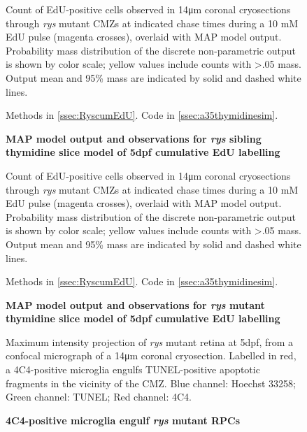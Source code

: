 \begin{figure}[!h]
    \caption{{\bf  MAP model output and observations for \textit{rys} sibling thymidine slice model of 5dpf cumulative EdU labelling}}
    Count of EdU-positive cells observed in 14\si{\micro\metre} coronal cryosections through \textit{rys} mutant CMZs at indicated chase times during a 10 mM EdU pulse (magenta crosses), overlaid with MAP model output. Probability mass distribution of the discrete non-parametric output is shown by color scale; yellow values include counts with >.05 mass. Output mean and 95\% mass are indicated by solid and dashed white lines.

    Methods in \autoref{ssec:RyscumEdU}. Code in \autoref{ssec:a35thymidinesim}.
    \label{a35sibMAP}
\end{figure}

\begin{figure}[!h]
    \caption{{\bf MAP model output and observations for \textit{rys} mutant thymidine slice model of 5dpf cumulative EdU labelling}}
    Count of EdU-positive cells observed in 14\si{\micro\metre} coronal cryosections through \textit{rys} mutant CMZs at indicated chase times during a 10 mM EdU pulse (magenta crosses), overlaid with MAP model output. Probability mass distribution of the discrete non-parametric output is shown by color scale; yellow values include counts with >.05 mass. Output mean and 95\% mass are indicated by solid and dashed white lines.

    Methods in \autoref{ssec:RyscumEdU}. Code in \autoref{ssec:a35thymidinesim}.
    \label{a35rysMAP}
\end{figure}

\begin{figure}[!h]
    \caption{{\bf 4C4-positive microglia engulf \textit{rys} mutant RPCs}}
    Maximum intensity projection of \textit{rys} mutant retina at 5dpf, from a confocal micrograph of a 14\si{\micro\metre} coronal cryosection. Labelled in red, a 4C4-positive microglia engulfs TUNEL-positive apoptotic fragments in the vicinity of the CMZ. Blue channel: Hoechst 33258; Green channel: TUNEL; Red channel: 4C4.
    \label{phagocytosis}
\end{figure}

